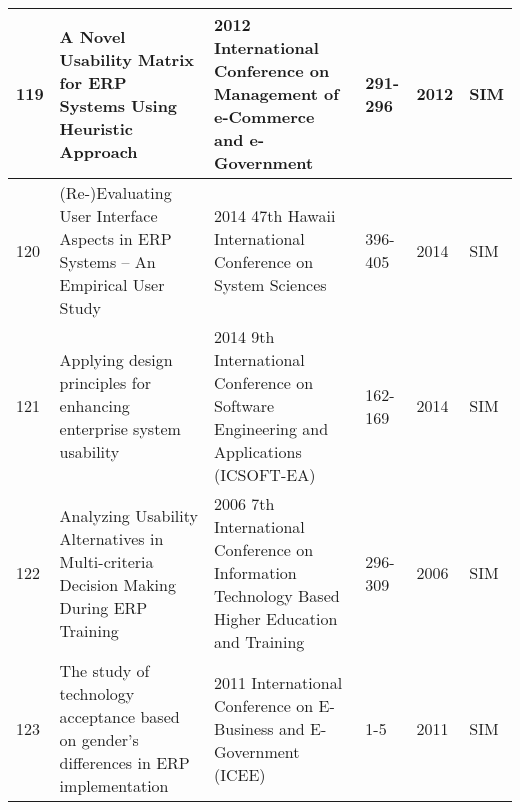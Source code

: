 \begin{landscape}
\begin{longtable}{||p{1.7cm}|p{11.0cm}|p{6.0cm}|p{1.7cm}|p{1cm}|p{1cm}||}
	\hline
	119 & A Novel Usability Matrix for ERP Systems Using Heuristic Approach & 2012 International Conference on Management of e-Commerce and e-Government & 291-296 & 2012 & SIM \\ 
	\hline
	120 & (Re-)Evaluating User Interface Aspects in ERP Systems -- An Empirical User Study & 2014 47th Hawaii International Conference on System Sciences & 396-405 & 2014 & SIM \\ 
	\hline
	121 & Applying design principles for enhancing enterprise system usability & 2014 9th International Conference on Software Engineering and Applications (ICSOFT-EA) & 162-169 & 2014 & SIM \\ 
	\hline
	122 & Analyzing Usability Alternatives in Multi-criteria Decision Making During ERP Training & 2006 7th International Conference on Information Technology Based Higher Education and Training & 296-309 & 2006 & SIM \\ 
	\hline
	123 & The study of technology acceptance based on gender's differences in ERP implementation & 2011 International Conference on E-Business and E-Government (ICEE) & 1-5 & 2011 & SIM \\  
	\hline
\end{longtable}
\end{landscape}